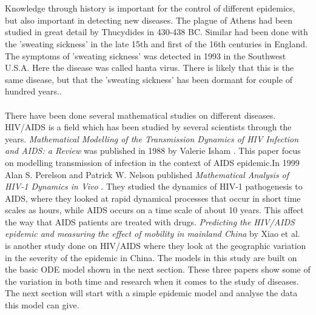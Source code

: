 \documentclass[%
twoside,                 %
final,                   %
10pt]{article}
\begin{document}
\\
\\
Knowledge through history is important for the control of different epidemics, but also important in detecting new diseases. The plague of Athens had been studied in great detail by Thucydides in 430-438 BC. Similar had been done with the 'sweating sickness' in the late 15th and first of the 16th centuries in England. The symptoms of 'sweating sickness' was detected in 1993 in the Southwest U.S.A. Here the disease was called hanta virus. There is likely that this is the same disease, but that the 'sweating sickness' has been dormant for couple of hundred years.\cite[p.~317]{murray2002mathematical}.~
\\
\\
There have been done several mathematical studies on different diseases. HIV/AIDS is a field which has been studied by several scientists through the years. \emph{Mathematical Modelling of the Transmission Dynamics of HIV Infection and AIDS: a Review} was published in 1988 by Valerie Isham \cite{isham1988mathematical}. This paper focus on modelling transmission of infection in the context of AIDS epidemic.In 1999 Alan S. Perelson and Patrick W. Nelson published \emph{Mathematical Analysis of HIV-1 Dynamics in Vivo} \cite{perelson1999mathematical}. They studied the dynamics of HIV-1 pathogenesis to AIDS, where they looked at rapid dynamical processes that occur in short time scales as hours, while AIDS occurs on a time scale of about 10 years. This affect the way that AIDS patients are treated with drugs. \emph{Predicting the HIV/AIDS epidemic and measuring the effect of mobility in mainland China} by Xiao et al.~\cite{xiao2013predicting} is another study done on HIV/AIDS where they look at the geographic variation in the severity of the epidemic in China. The models in this study are built on the basic ODE model shown in the next section. These three papers show some of the variation in both time and research when it comes to the study of diseases. The next section will start with a simple epidemic model and analyse the data this model can give. 
\end{document}
